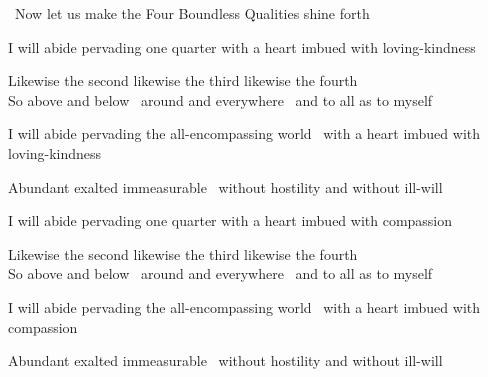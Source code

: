 \begin{leader-english}
  \anglebracketleft\ \hspace{-0.5mm}Now let us make the Four Boundless Qualities shine forth \hspace{-0.5mm}\anglebracketright\
\end{leader-english}

\smallskip

\begin{english-hang}
  I will abide pervading one quarter with a heart imbued with loving-kindness
\end{english-hang}

\begin{english}
  Likewise the second likewise the third likewise the fourth\\
  So above and below \breathmark\ around and everywhere \breathmark\ and to all as to myself
\end{english}

\begin{english-hang}
  I will abide pervading the all-encompassing world \breathmark\ with a heart imbued with loving-kindness
\end{english-hang}

\begin{english-hang}
  Abundant exalted immeasurable \breathmark\ without hostility and without ill-will
\end{english-hang}

\medskip

\begin{english-hang}
  I will abide pervading one quarter with a heart imbued with compassion
\end{english-hang}

\begin{english}
  Likewise the second likewise the third likewise the fourth\\
  So above and below \breathmark\ around and everywhere \breathmark\ and to all as to myself
\end{english}

\begin{english-hang}
  I will abide pervading the all-encompassing world \breathmark\ with a heart imbued with compassion
\end{english-hang}

\begin{english-hang}
  Abundant exalted immeasurable \breathmark\ without hostility and without ill-will
\end{english-hang}

